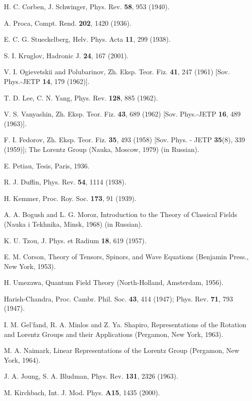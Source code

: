 \documentclass[a4paper,12pt]{article}
\begin{document}
\begin{thebibliography}{999}

  H. C. Corben, J. Schwinger, Phys. Rev. \textbf{58}, 953 (1940).

 A. Proca, Compt. Rend. \textbf{202}, 1420 (1936).

  E. C. G. Stueckelberg, Helv. Phys. Acta \textbf{11}, 299 (1938).

 S. I. Kruglov, Hadronic J. \textbf{24}, 167 (2001).

 V. I. Ogievetskii and Polubarinov, Zh. Eksp. Teor.
Fiz. \textbf{41}, 247 (1961) [Sov. Phys.-JETP \textbf{14}, 179
(1962)].

  T. D. Lee, C. N. Yang, Phys. Rev. \textbf{128}, 885 (1962).

 V. S. Vanyashin, Zh. Eksp. Teor.
Fiz. \textbf{43}, 689 (1962) [Sov. Phys.-JETP \textbf{16}, 489
(1963)].

  F. I. Fedorov, Zh. Eksp. Teor. Fiz. {\bf 35}, 493 (1958)
[Sov. Phys. - JETP {\bf 35}(8), 339 (1959)]; The Lorentz Group
(Nauka, Moscow, 1979) (in Russian).

  E. Petiau, Tesis, Paris, 1936.

  R. J. Duffin, Phys. Rev. \textbf{54}, 1114 (1938).

  H. Kemmer, Proc. Roy. Soc. \textbf{173}, 91 (1939).

  A. A. Bogush and L. G. Moroz, Introduction to the Theory
of Classical Fields (Nauka i Tekhnika, Minsk, 1968) (in Russian).

 K. U. Tzou, J. Phys. et Radium {\bf 18}, 619 (1957).

 E. M. Corson, Theory of Tensors, Spinors, and Wave Equations
(Benjamin Press., New York, 1953).

 H. Umezawa, Quantum Field Theory (North-Holland, Amsterdam,
1956).

 Harish-Chandra, Proc. Cambr. Phil. Soc. {\bf 43}, 414 (1947);
Phys. Rev. {\bf 71}, 793 (1947).

 I. M. Gel'fand, R. A. Minlos and Z. Ya. Shapiro, Representations
of the Rotation and Lorentz Groups and their Applications
(Pergamon, New York, 1963).

 M. A. Naimark, Linear Representations of the Lorentz Group
(Pergamon, New York, 1964).

 J. A. Joung, S. A. Bludman, Phys. Rev. \textbf{131}, 2326 (1963).

 M. Kirchbach, Int. J. Mod. Phys. {\bf A15}, 1435 (2000).


\end{thebibliography}
\end{document}
